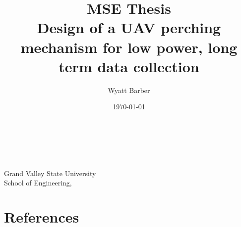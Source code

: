 \documentclass{article}
\makeatletter
\renewcommand{\maketitle}{%
    \begin{titlepage}  
        \begin{center}
            \@title\\
            \@author\\
            \@date\\
            \vspace*{\fill}
            Grand Valley State University\\
            School of Engineering, \\
        \end{center}
    \end{titlepage}
}
\makeatother
\begin{document}
\title{{\huge MSE Thesis}\\Design of a UAV perching mechanism for low power, long term data collection}

\author{Wyatt Barber}
\date{\today}

\maketitle

\tableofcontents

\vspace*{\fill}











\section{References}
\printbibliography[heading=none]
\end{document}
